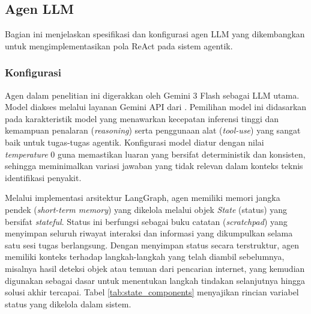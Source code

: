\subsection{Agen LLM}
Bagian ini menjelaskan spesifikasi dan konfigurasi agen LLM yang dikembangkan untuk mengimplementasikan pola ReAct pada sistem agentik.

\subsubsection{Konfigurasi}
Agen dalam penelitian ini digerakkan oleh Gemini 3 Flash sebagai LLM utama. Model diakses melalui layanan Gemini API dari \textcite{google2025geminiapi}. Pemilihan model ini didasarkan pada karakteristik model yang menawarkan kecepatan inferensi tinggi dan kemampuan penalaran (\textit{reasoning}) serta penggunaan alat (\textit{tool-use}) yang sangat baik untuk tugas-tugas agentik. Konfigurasi model diatur dengan nilai \textit{temperature} 0 guna memastikan luaran yang bersifat deterministik dan konsisten, sehingga meminimalkan variasi jawaban yang tidak relevan dalam konteks teknis identifikasi penyakit.

Melalui implementasi arsitektur LangGraph, agen memiliki memori jangka pendek (\textit{short-term memory}) yang dikelola melalui objek \textit{State} (status) yang bersifat \textit{stateful}. Status ini berfungsi sebagai buku catatan (\textit{scratchpad}) yang menyimpan seluruh riwayat interaksi dan informasi yang dikumpulkan selama satu sesi tugas berlangsung. Dengan menyimpan status secara terstruktur, agen memiliki konteks terhadap langkah-langkah yang telah diambil sebelumnya, misalnya hasil deteksi objek atau temuan dari pencarian internet, yang kemudian digunakan sebagai dasar untuk menentukan langkah tindakan selanjutnya hingga solusi akhir tercapai. Tabel \ref{tab:state_components} menyajikan rincian variabel status yang dikelola dalam sistem.

